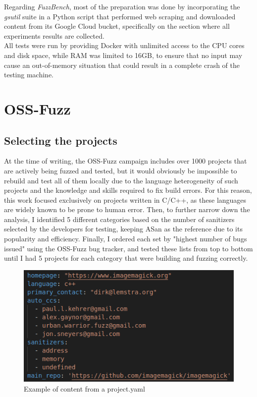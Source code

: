 Regarding \textit{FuzzBench}, most of the preparation was done by incorporating the \textit{gsutil} suite in a Python script that performed web scraping and downloaded content from its Google Cloud bucket, specifically on the section where all experiments results are collected.
\ \\

All tests were run by providing Docker with unlimited access to the CPU cores and disk space, while RAM was limited to 16GB, to ensure that no input may cause an out-of-memory situation that could result in a complete crash of the testing machine. 


\newpage
\section{OSS-Fuzz}
\subsection{Selecting the projects} \label{selection}
At the time of writing, the OSS-Fuzz campaign includes over 1000 projects that are actively being fuzzed and tested, but it would obviously be impossible to rebuild and test all of them locally due to the language heterogeneity of such projects and the knowledge and skills required to fix build errors. For this reason, this work focused exclusively on projects written in C/C++, as these languages are widely known to be prone to human error. Then, to further narrow down the analysis, I identified 5 different categories based on the number of sanitizers selected by the developers for testing, keeping ASan as the reference due to its popularity and efficiency. Finally, I ordered each set by "highest number of bugs issued" using the OSS-Fuzz bug tracker, and tested these lists from top to bottom until I had 5 projects for each category that were building and fuzzing correctly.

\begin{figure}[h]
\centering
\includegraphics[scale=0.5]{foto/project_yaml.png}
\caption{Example of content from a project.yaml}
\label{fig:project_yaml}
\end{figure}

